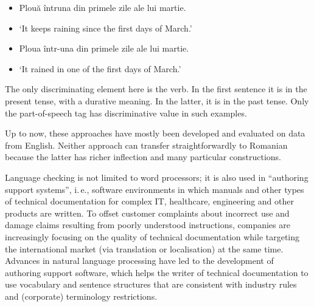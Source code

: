 \begin{multicols}{2}
\begin{example}
\begin{itemize}
\item []Plouă întruna din primele zile ale lui martie.
\item []`It keeps raining since the first days of March.'
\end{itemize}
\end{example}

\begin{example}
\begin{itemize}
\item []Ploua într-una din primele zile ale lui martie.
\item []`It rained in one of the first days of March.'
\end{itemize}
\end{example}

The only discriminating element here is the verb. In the first sentence it is in the present tense, with a durative meaning. In the latter, it is in the past tense. Only the part-of-speech tag has discriminative value in such examples.

Up to now, these approaches have mostly been developed and evaluated on data from English. Neither approach can transfer straightforwardly to Romanian because the latter has richer inflection and many particular constructions.


Language checking is not limited to word processors; it is also used in “authoring support systems”, i.\,e., software environments in which manuals and other types of technical documentation for complex IT, healthcare, engineering and other products are written. To offset customer complaints about incorrect use and damage claims resulting from poorly understood instructions, companies are increasingly focusing on the quality of technical documentation while targeting the international market (via translation or localisation) at the same time. Advances in natural language processing have led to the development of authoring support software, which helps the writer of technical documentation to use vocabulary and sentence structures that are consistent with industry rules and (corporate) terminology restrictions.


\end{multicols}
